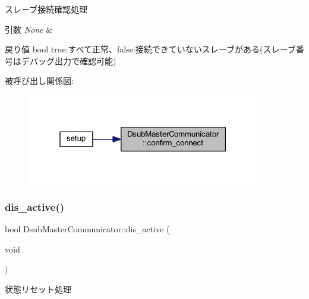 スレーブ接続確認処理 


\begin{DoxyParams}{引数}
{\em None} & \\
\hline
\end{DoxyParams}
\begin{DoxyReturn}{戻り値}
bool true\+:すべて正常、false\+:接続できていないスレーブがある(スレーブ番号はデバッグ出力で確認可能) 
\end{DoxyReturn}
被呼び出し関係図\+:
\nopagebreak
\begin{figure}[H]
\begin{center}
\leavevmode
\includegraphics[width=289pt]{class_dsub_master_communicator_acb3acb522c4ff0099044fe9451008864_icgraph}
\end{center}
\end{figure}
\mbox{\label{class_dsub_master_communicator_ac0a9298c691adbdf844f85d680d7e554}} 
\subsubsection{\texorpdfstring{dis\_active()}{dis\_active()}}
{\footnotesize\ttfamily bool Dsub\+Master\+Communicator\+::dis\+\_\+active (\begin{DoxyParamCaption}\item[{void}]{ }\end{DoxyParamCaption})}



状態リセット処理 


